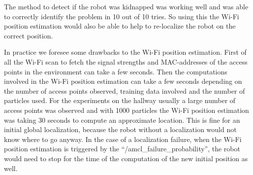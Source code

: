 The method to detect if the robot was kidnapped was working well and was able to correctly identify the problem in 10 out of 10 tries. So using this the Wi-Fi position estimation would also be able to help to re-localize the robot on the correct position. 

In practice we foresee some drawbacks to the Wi-Fi position estimation. First of all the Wi-Fi scan to fetch the signal strengths and MAC-addresses of the access points in the environment can take a few seconds. Then the computations involved in the Wi-Fi position estimation can take a few seconds depending on the number of access points observed, training data involved and the number of particles used. For the experiments on the hallway usually a large number of access points was observed and with 1000 particles the Wi-Fi position estimation was taking 30 seconds to compute an approximate location. This is fine for an initial global localization, because the robot without a localization would not know where to go anyway. In the case of a localization failure, when the Wi-Fi position estimation is triggered by the ``/amcl\_failure\_probability'', the robot would need to stop for the time of the computation of the new initial position as well. 
